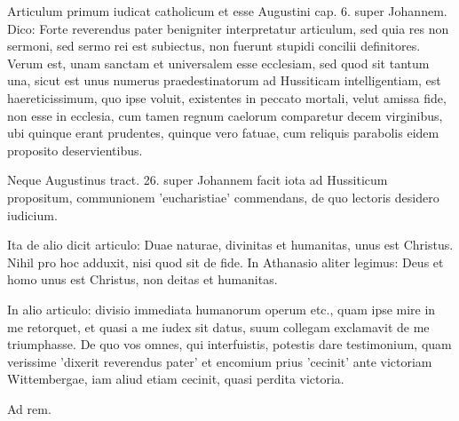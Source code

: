 Articulum primum iudicat catholicum et esse Augustini cap. 6. super Johannem. Dico: Forte reverendus pater benigniter interpretatur articulum, sed quia res non sermoni, sed sermo rei est subiectus, non fuerunt stupidi concilii definitores. Verum est, unam sanctam et universalem esse ecclesiam, sed quod sit tantum una, sicut est unus numerus praedestinatorum ad Hussiticam intelligentiam, est haereticissimum, quo ipse voluit, existentes in peccato mortali, velut amissa fide, non esse in ecclesia, cum tamen regnum caelorum comparetur decem virginibus, ubi quinque erant prudentes, quinque vero fatuae, cum reliquis parabolis eidem proposito deservientibus.

Neque Augustinus tract. 26. super Johannem facit iota ad Hussiticum propositum, communionem 'eucharistiae' commendans, de quo lectoris desidero iudicium.

Ita de alio dicit articulo: Duae naturae, divinitas et humanitas, unus est Christus. Nihil pro hoc adduxit, nisi quod sit de fide. In Athanasio aliter legimus: Deus et homo unus est Christus, non deitas et humanitas.

In alio articulo: divisio immediata humanorum operum etc., quam ipse mire in me retorquet, et quasi a me iudex sit datus, suum collegam exclamavit de me triumphasse. De quo vos omnes, qui interfuistis, potestis dare testimonium, quam verissime 'dixerit reverendus pater' et encomium prius 'cecinit' ante victoriam Wittembergae, iam aliud etiam cecinit, quasi perdita victoria.

Ad rem.

